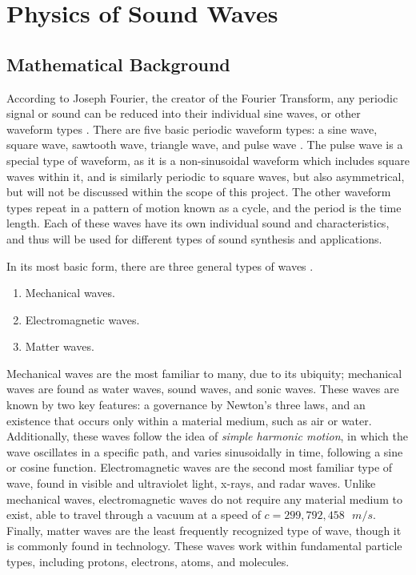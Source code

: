 \chapter{Physics of Sound Waves}\label{chapter:theory}

\section{Mathematical Background}\label{section:waveforms}
According to Joseph Fourier, the creator of the Fourier Transform, any periodic signal or sound can be reduced into their individual sine waves, or other waveform types \cite{Broughton_Bryan_2008}. There are five basic periodic waveform types: a sine wave, square wave, sawtooth wave, triangle wave, and pulse wave \cite{Winer_2018}. The pulse wave is a special type of waveform, as it is a non-sinusoidal waveform which includes square waves within it, and is similarly periodic to square waves, but also asymmetrical, but will not be discussed within the scope of this project. The other waveform types repeat in a pattern of motion known as a cycle, and the period is the time length. Each of these waves have its own individual sound and characteristics, and thus will be used for different types of sound synthesis and applications.

In its most basic form, there are three general types of waves \cite{Halliday_Resnick_Walker_2005}.

\begin{enumerate}
	\item Mechanical waves.
	\item Electromagnetic waves.
	\item Matter waves.
\end{enumerate}

Mechanical waves are the most familiar to many, due to its ubiquity; mechanical waves are found as water waves, sound waves, and sonic waves. These waves are known by two key features: a governance by Newton's three laws, and an existence that occurs only within a material medium, such as air or water. Additionally, these waves follow the idea of \textit{simple harmonic motion}, in which the wave oscillates in a specific path, and varies sinusoidally in time, following a sine or cosine function. Electromagnetic waves are the second most familiar type of wave, found in visible and ultraviolet light, x-rays, and radar waves. Unlike mechanical waves, electromagnetic waves do not require any material medium to exist, able to travel through a vacuum at a speed of $c = 299,792,458 \textrm{ } m/s$. Finally, matter waves are the least frequently recognized type of wave, though it is commonly found in technology. These waves work within fundamental particle types, including protons, electrons, atoms, and molecules. 

